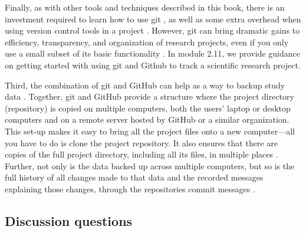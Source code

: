 \documentclass[]{tufte-book}
\begin{document}
Finally, as with other tools and techniques described in this book, there is an
investment required to learn how to use git \citep{perez2016ten}, as well
as some extra overhead when using version control tools in a project
\citep{raymond2003art}. However, git can bring dramatic gains to
efficiency, transparency, and organization of research projects, even if you
only use a small subset of its basic functionality \citep{perez2016ten}. In module
2.11, we provide guidance on getting started with using git and Github to track
a scientific research project.

Third, the combination of git and GitHub can help as a way to backup study data
\citep{blischak2016quick, perez2016ten, perkel2018git}. Together, git and GitHub
provide a structure where the project directory (repository) is copied on
multiple computers, both the users' laptop or desktop computers and on a remote
server hosted by GitHub or a similar organization. This set-up makes it easy to
bring all the project files onto a new computer---all you have to do is clone
the project repository. It also ensures that there are copies of the full
project directory, including all its files, in multiple places
\citep{blischak2016quick}. Further, not only is the data backed up across multiple
computers, but so is the full history of all changes made to that data and the
recorded messages explaining those changes, through the repositories commit
messages \citep{perez2016ten}.

\subsection{Discussion questions}\label{discussion-questions-1}
\end{document}
